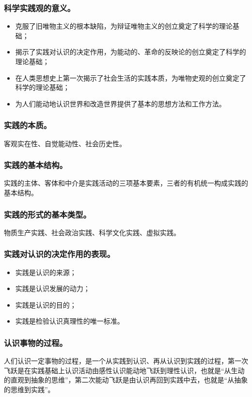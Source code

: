 \documentclass{article}
\begin{document}
\subsubsection{科学实践观的意义。}
\begin{itemize}
    \item 克服了旧唯物主义的根本缺陷，为辩证唯物主义的创立奠定了科学的理论基础；
    \item 揭示了实践对认识的决定作用，为能动的、革命的反映论的创立奠定了科学的理论基础；
    \item 在人类思想史上第一次揭示了社会生活的实践本质，为唯物史观的创立奠定了科学的理论基础；
    \item 为人们能动地认识世界和改造世界提供了基本的思想方法和工作方法。
\end{itemize}

\subsubsection{实践的本质。}
客观实在性、自觉能动性、社会历史性。

\subsubsection{实践的基本结构。}
实践的主体、客体和中介是实践活动的三项基本要素，三者的有机统一构成实践的基本结构。

\subsubsection{实践的形式的基本类型。}
物质生产实践、社会政治实践、科学文化实践、虚拟实践。

\subsubsection{实践对认识的决定作用的表现。}
\begin{itemize}
    \item 实践是认识的来源；
    \item 实践是认识发展的动力；
    \item 实践是认识的目的；
    \item 实践是检验认识真理性的唯一标准。
\end{itemize}

\subsubsection{认识事物的过程。}
人们认识一定事物的过程，是一个从实践到认识、再从认识到实践的过程，第一次飞跃是在实践基础上认识活动由感性认识能动地飞跃到理性认识，也就是“从生动的直观到抽象的思维”，第二次能动飞跃是由认识再回到实践中去，也就是“从抽象的思维到实践”。
\end{document}
